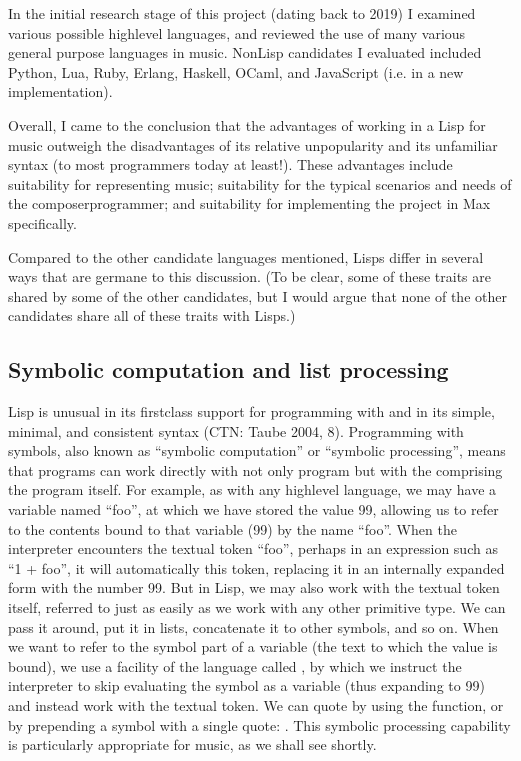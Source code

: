 \documentclass[letterpaper,10pt,english]{sphinxmanual}
\begin{document}
\sphinxAtStartPar
In the initial research stage of this project (dating back to 2019) I examined various possible high\sphinxhyphen{}level languages,
and reviewed the use of many various general purpose languages in music.
Non\sphinxhyphen{}Lisp candidates I evaluated included Python, Lua, Ruby, Erlang, Haskell, OCaml, and JavaScript (i.e. in a new implementation).

\sphinxAtStartPar
Overall, I came to the conclusion that the advantages of working in a Lisp for music outweigh the disadvantages
of its relative unpopularity and its unfamiliar syntax (to most programmers today at least!).
These advantages include suitability for representing music; suitability for the typical scenarios and needs of the composer\sphinxhyphen{}programmer;
and suitability for implementing the project in Max specifically.

\sphinxAtStartPar
Compared to the other candidate languages mentioned, Lisps differ in several ways that are germane to this
discussion. (To be clear, some of these traits are shared by some of the other candidates, but I would argue that none of the
other candidates share all of these traits with Lisps.)


\subsection{Symbolic computation and list processing}
\label{\detokenize{design:symbolic-computation-and-list-processing}}
\sphinxAtStartPar
Lisp is unusual in its first\sphinxhyphen{}class support for programming with  and in its simple, minimal, and consistent syntax (CTN: Taube 2004, 8).
Programming with symbols, also known as “symbolic computation” or “symbolic processing”, means
that programs can work directly with not only program  but with the  comprising the program itself.
For example, as with any high\sphinxhyphen{}level language, we may have a variable named “foo”, at which we have stored the value 99,
allowing us to refer to the contents bound to that variable (99) by the name “foo”.
When the interpreter encounters the textual token “foo”, perhaps in an expression such as “1 + foo”,
it will automatically  this token, replacing it in an internally expanded form with the number 99.
But in Lisp, we may also work with the textual token itself, referred to 
just as easily as we work with any other primitive type. We can pass it around, put it in lists,
concatenate it to other symbols, and so on.
When we want to refer to the symbol part of a variable (the text to which the value is bound),
we use a facility of the language called , by which we instruct the interpreter
to skip evaluating the symbol as a variable (thus expanding to 99) and instead work with the textual token.
We can quote by using the  function, or by prepending a symbol with a single quote: .
This symbolic processing capability is particularly appropriate for music, as we shall see shortly.
\end{document}
